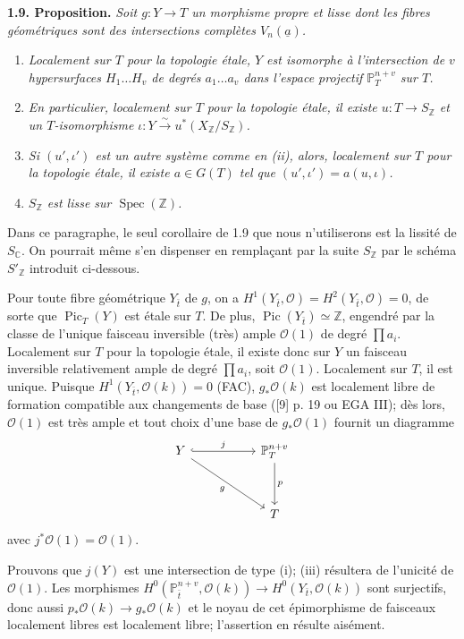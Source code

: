 \documentclass[10pt]{article}
\newcommand{\C}{\mathbb C}
\newcommand{\Pj}{\mathbb P}
\newcommand{\Z}{\mathbb Z}
\newcommand{\Spec}{\operatorname{Spec}}
\newcommand{\Pic}{\operatorname{Pic}}
\newcommand{\iso}{\xrightarrow{\sim}}
\begin{document}
\noindent\textbf{1.9. Proposition.} \emph{Soit \(g:Y\to T\) un morphisme propre et lisse dont les fibres géométriques sont des intersections complètes \(V_n(\underline a)\).}
\begin{enumerate}[label=(\roman*)]
\item \emph{Localement sur \(T\) pour la topologie étale, \(Y\) est isomorphe à l'intersection de \(v\) hypersurfaces \(H_1\ldots H_v\) de degrés \(a_1\ldots a_v\) dans l'espace projectif \(\Pj_T^{n+v}\) sur \(T\).}
\item \emph{En particulier, localement sur \(T\) pour la topologie étale, il existe \(u:T\to S_\Z\) et un \(T\)-isomorphisme \(\iota:Y\iso u^*(X_\Z/S_\Z)\).}
\item \emph{Si \((u',\iota')\) est un autre système comme en (ii), alors, localement sur \(T\) pour la topologie étale, il existe \(a\in G(T)\) tel que \((u',\iota')=a(u,\iota)\).}
\item \emph{\(S_\Z\) est lisse sur \(\Spec(\Z)\).}
\end{enumerate}

Dans ce paragraphe, le seul corollaire de 1.9 que nous n'utiliserons est la lissité de \(S_\C\). On pourrait même s'en dispenser en remplaçant par la suite \(S_\Z\) par le schéma \(S'_\Z\) introduit ci-dessous.

Pour toute fibre géométrique \(Y_{\bar t}\) de \(g\), on a \(H^1(Y_{\bar t},\mathcal O)=H^2(Y_{\bar t},\mathcal O)=0\), de sorte que \(\Pic_T(Y)\) est étale sur \(T\). De plus, \(\Pic(Y_{\bar t})\simeq\Z\), engendré par la classe de l'unique faisceau inversible (très) ample \(\mathcal O(1)\) de degré \(\prod a_i\). Localement sur \(T\) pour la topologie étale, il existe donc sur \(Y\) un faisceau inversible relativement ample de degré \(\prod a_i\), soit \(\mathcal O(1)\). Localement sur \(T\), il est unique. Puisque \(H^1(Y_{\bar t},\mathcal O(k))=0\) (FAC), \(g_*\mathcal O(k)\) est localement libre de formation compatible aux changements de base ([9] p. 19 ou EGA III); dès lors, \(\mathcal O(1)\) est très ample et tout choix d'une base de \(g_*\mathcal O(1)\) fournit un diagramme
\[
\begin{tikzcd}[column sep=5.2em,row sep=3.4em]
Y \arrow[r,hook,"j"] \arrow[dr,"g"'] & \Pj_T^{n+v} \arrow[d,"p"]\\
& T
\end{tikzcd}
\]
avec \(j^*\mathcal O(1)=\mathcal O(1)\).

Prouvons que \(j(Y)\) est une intersection de type (i); (iii) résultera de l'unicité de \(\mathcal O(1)\). Les morphismes \(H^0(\Pj_{\bar t}^{n+v},\mathcal O(k))\to H^0(Y_{\bar t},\mathcal O(k))\) sont surjectifs, donc aussi \(p_*\mathcal O(k)\to g_*\mathcal O(k)\) et le noyau de cet épimorphisme de faisceaux localement libres est localement libre; l'assertion en résulte aisément.
\end{document}
